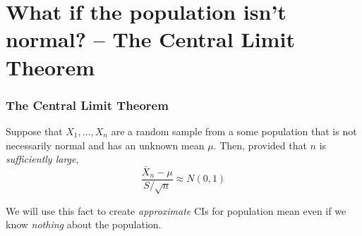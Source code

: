 \section{What if the population isn't normal? -- The Central Limit Theorem}
\begin{frame}
\frametitle{The Central Limit Theorem}
Suppose that $X_1, \hdots, X_n$ are a random sample from a some population that is \alert{not necessarily normal} and has an unknown mean $\mu$.
Then, provided that $n$ is \alert{\emph{sufficiently large}}, 
$$\frac{\bar{X}_n -\mu}{S/\sqrt{n}} \approx N(0,1)$$

We will use this fact to create \emph{approximate} CIs for population mean even if we know \emph{nothing} about the population.
\end{frame}
